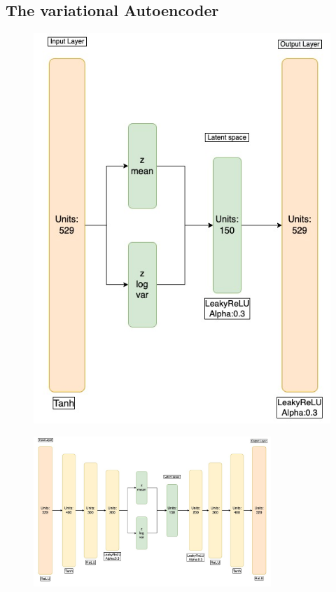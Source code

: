 \subsection*{The variational Autoencoder}


\begin{figure}[h!]
    \centering
    \includegraphics[scale=0.5]{Figures/nnarchitect/vae_small.jpeg}
    \caption{ }
    \label{fig:vae_small}
\end{figure}

\begin{figure}[h!]
    \centering
    \includegraphics[width=0.8\textwidth]{Figures/nnarchitect/vae_big.jpeg}
    \caption{ }
    \label{fig:vae_big}
\end{figure}
